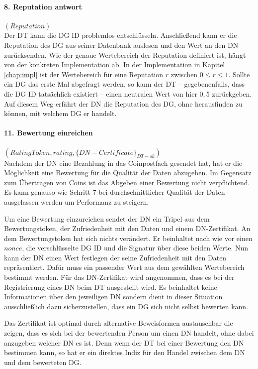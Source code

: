 \documentclass[
	fontsize=11pt,
	headings=small,
	parskip=half,           %
	bibliography=totoc,
	numbers=noenddot,       %
	open=any,               %
]{scrreprt}
\begin{document}
\paragraph{8. Reputation antwort}$(Reputation)$\\
Der DT kann die DG ID problemlos entschlüsseln. Anschließend kann er die Reputation des DG aus seiner Datenbank auslesen und den Wert an den DN zurücksenden. Wie der genaue Wertebereich der Reputation definiert ist, hängt von der konkreten Implementation ab. In der Implementation in Kapitel \ref{chap:impl} ist der Wertebereich für eine Reputation $r$ zwischen $0\leq r\leq 1$. Sollte ein DG das erste Mal abgefragt werden, so kann der DT -- gegebenenfalls, dass die DG ID tatsächlich existiert -- einen neutralen Wert von hier $0,5$ zurückgeben. Auf diesem Weg erfährt der DN die Reputation des DG, ohne herausfinden zu können, mit welchem DG er handelt.

\paragraph{11. Bewertung einreichen}$(RatingToken, rating, {\{DN-Certificate\}}_{DT-sk})$\\
Nachdem der DN eine Bezahlung in das Coinpostfach gesendet hat, hat er die Möglichkeit eine Bewertung für die Qualität der Daten abzugeben. Im Gegensatz zum Übertragen von Coins ist das Abgeben einer Bewertung nicht verpflichtend. Es kann genauso wie Schritt 7 bei durchschnittlicher Qualität der Daten ausgelassen werden um Performanz zu steigern. 

Um eine Bewertung einzureichen sendet der DN ein Tripel aus dem Bewertungstoken, der Zufriedenheit mit den Daten und einem DN-Zertifikat. An dem Bewertungstoken hat sich nichts verändert. Er beinhaltet nach wie vor einen $nonce$, die verschlüsselte DG ID und die Signatur über diese beiden Werte. Nun kann der DN einen Wert festlegen der seine Zufriedenheit mit den Daten repräsentiert. Dafür muss ein passender Wert aus dem gewählten Wertebereich bestimmt werden. Für das DN-Zertifikat wird angenommen, dass es bei der Registrierung eines DN beim DT ausgestellt wird. Es beinhaltet keine Informationen über den jeweiligen DN sondern dient in dieser Situation ausschließlich dazu sicherzustellen, dass ein DG sich nicht selbst bewerten kann. 

Das Zertifikat ist optimal durch alternative Beweisformen austauschbar die zeigen, dass es sich bei der bewertenden Person um einen DN handelt, ohne dabei anzugeben welcher DN es ist. Denn wenn der DT bei einer Bewertung den DN bestimmen kann, so hat er ein direktes Indiz für den Handel zwischen dem DN und dem bewerteten DG.
\end{document}

